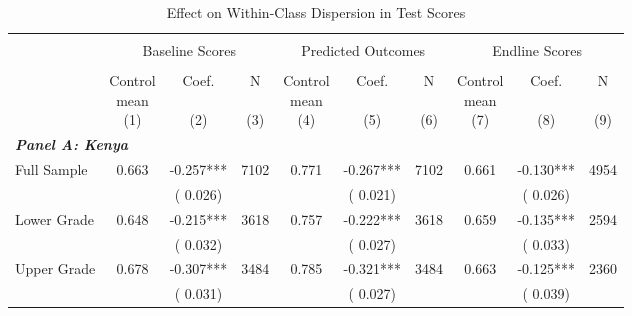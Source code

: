 \begin{table}[H]
\centering
\caption{Effect on Within-Class Dispersion in Test Scores}
\label{tab:dispersion_firststage}
\begin{threeparttable}
\fontsize{9}{11}\selectfont
\begin{tabular}[t]{lccccccccc}
\toprule
\multicolumn{10}{c}{ } \\
\multicolumn{1}{c}{ } & \multicolumn{3}{c}{Baseline Scores} & \multicolumn{3}{c}{Predicted Outcomes} & \multicolumn{3}{c}{Endline Scores} \\
\cmidrule(l{3pt}r{3pt}){2-4} \cmidrule(l{3pt}r{3pt}){5-7} \cmidrule(l{3pt}r{3pt}){8-10}
\multicolumn{10}{c}{ } \\
 & \Longstack{Control \\ mean \\ (1)} & \Longstack{Coef. \\  \\ (2)} & \Longstack{N \\ \\ (3)} & \Longstack{Control \\ mean \\ (4)} & \Longstack{Coef. \\ \\ (5)} & \Longstack{N \\ \\ (6)} & \Longstack{Control \\ mean \\ (7)} & \Longstack{Coef. \\ \\ (8)} & \Longstack{N \\ \\ (9)} \\
\midrule
\multicolumn{10}{l}{\textbf{\textit{Panel A: Kenya}}} \\
Full Sample &  0.663 &  -0.257*** & 7102 &  0.771 &  -0.267*** & 7102 &  0.661 &  -0.130*** & 4954 \\
 &  & (  0.026) &  &  & (  0.021) &  &  & (  0.026) & \\
Lower Grade &  0.648 &  -0.215*** & 3618 &  0.757 &  -0.222*** & 3618 &  0.659 &  -0.135*** & 2594 \\
 &  & (  0.032) &  &  & (  0.027) &  &  & (  0.033) & \\
Upper Grade &  0.678 &  -0.307*** & 3484 &  0.785 &  -0.321*** & 3484 &  0.663 &  -0.125*** & 2360 \\
 &  & (  0.031) &  &  & (  0.027) &  &  & (  0.039) & \\

\end{tabular}
\end{threeparttable}
\end{table}
